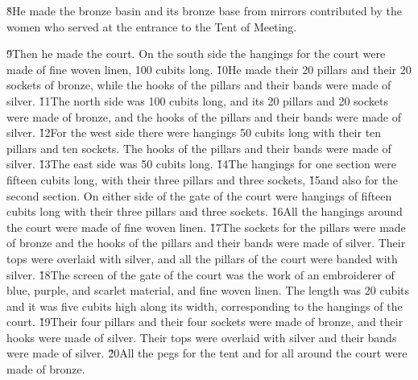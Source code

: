 \v{8}He made the bronze basin and its bronze base from mirrors contributed by the women who served at the entrance to the Tent of Meeting.

\v{9}Then he made the court. On the south side the hangings for the court were made of fine woven linen, 100 cubits long. \v{10}He made their 20 pillars and their 20 sockets of bronze, while the hooks of the pillars and their bands were made of silver. \v{11}The north side was 100 cubits long, and its 20 pillars and 20 sockets were made of bronze, and the hooks of the pillars and their bands were made of silver. \v{12}For the west side there were hangings 50 cubits long with their ten pillars and ten sockets. The hooks of the pillars and their bands were made of silver. \v{13}The east side was 50 cubits long. \v{14}The hangings for one section were fifteen cubits long, with their three pillars and three sockets, \v{15}and also for the second section. On either side of the gate of the court were hangings of fifteen cubits long with their three pillars and three sockets. \v{16}All the hangings around the court were made of fine woven linen. \v{17}The sockets for the pillars were made of bronze and the hooks of the pillars and their bands were made of silver. Their tops were overlaid with silver, and all the pillars of the court were banded with silver. \v{18}The screen of the gate of the court was the work of an embroiderer of blue, purple, and scarlet material, and fine woven linen. The length was 20 cubits and it was five cubits high along its width, corresponding to the hangings of the court. \v{19}Their four pillars and their four sockets were made of bronze, and their hooks were made of silver. Their tops were overlaid with silver and their bands were made of silver. \v{20}All the pegs for the tent and for all around the court were made of bronze.

